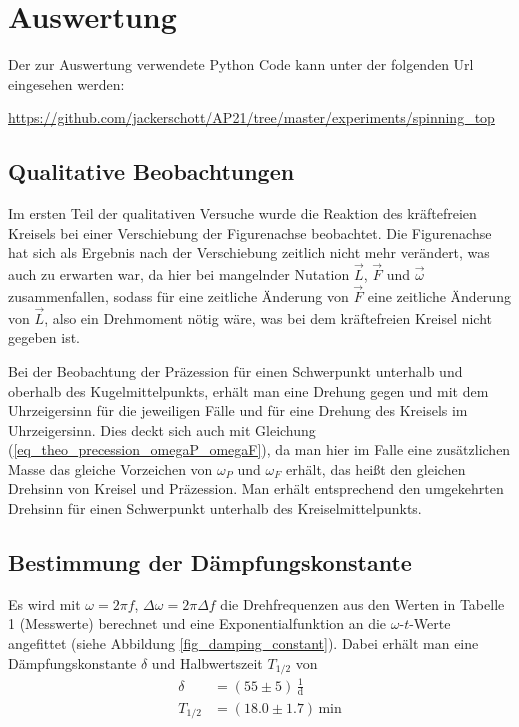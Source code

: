 \documentclass[12pt,a4paper,german]{scrartcl}
\numberwithin{equation}{section}
\begin{document}
  \section{Auswertung}
  Der zur Auswertung verwendete Python Code kann unter der folgenden Url eingesehen werden:
  \begin{center}
    \href{https://github.com/jackerschott/AP21/tree/master/experiments/spinning_top}{https://github.com/jackerschott/AP21/tree/master/experiments/spinning\_top}
  \end{center}
  
  \subsection{Qualitative Beobachtungen}
  Im ersten Teil der qualitativen Versuche wurde die Reaktion des kräftefreien Kreisels bei einer Verschiebung der Figurenachse beobachtet.
  Die Figurenachse hat sich als Ergebnis nach der Verschiebung zeitlich nicht mehr verändert, was auch zu erwarten war, da hier bei mangelnder Nutation $\vec{L}$, $\vec{F}$ und $\vec{\omega}$ zusammenfallen, sodass für eine zeitliche Änderung von $\vec{F}$ eine zeitliche Änderung von $\vec{L}$, also ein Drehmoment nötig wäre, was bei dem kräftefreien Kreisel nicht gegeben ist.

  Bei der Beobachtung der Präzession für einen Schwerpunkt unterhalb und oberhalb des Kugelmittelpunkts, erhält man eine Drehung gegen und mit dem Uhrzeigersinn für die jeweiligen Fälle und für eine Drehung des Kreisels im Uhrzeigersinn.
  Dies deckt sich auch mit Gleichung (\ref{eq_theo_precession_omegaP_omegaF}), da man hier im Falle eine zusätzlichen Masse das gleiche Vorzeichen von $\omega_P$ und $\omega_F$ erhält, das heißt den gleichen Drehsinn von Kreisel und Präzession.
  Man erhält entsprechend den umgekehrten Drehsinn für einen Schwerpunkt unterhalb des Kreiselmittelpunkts.

  \subsection{Bestimmung der Dämpfungskonstante}
  Es wird mit $\omega = 2 \pi f$, $\Delta \omega = 2 \pi \Delta f$ die Drehfrequenzen aus den Werten in Tabelle 1 (Messwerte) berechnet und eine Exponentialfunktion an die $\omega$-$t$-Werte angefittet (siehe Abbildung \ref{fig_damping_constant}).
  Dabei erhält man eine Dämpfungskonstante $\delta$ und Halbwertszeit $T_{1/2}$ von
  \begin{align}
    \delta &= (55 \pm 5) \, \frac{1}{\text{d}} \nonumber \\
    T_{1/2} &= (18.0 \pm 1.7) \, \text{min}
  \end{align}
\end{document}
